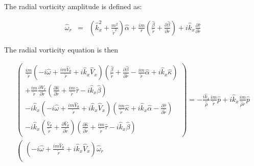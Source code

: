 The radial vorticity amplitude is defined as:

\begin{eqnarray}
\widehat{\omega}_r
&=&
\left(\widehat{k}_x^2 + \frac{m^2}{\widetilde{r}^2} \right) \widehat{\alpha}
+
\frac{im}{r} 
\left(
\frac{\widehat{\beta}}{\widetilde{r}}
+\frac{\partial \widehat{\beta}}{\partial \widetilde{r}}
\right)
+i \widehat{k}_x 
\frac{\partial \widehat{\tau}}{\partial \widetilde{r}}
\nonumber
\end{eqnarray}

The radial vorticity equation is then

\begin{small}
\begin{eqnarray}
\left(
\begin{array}{r}
\frac{i m}{\widetilde{r}}
\left(
-i \widehat{\omega}
+ \frac{i m \widehat{V}_{\theta}}{\widetilde{r}}
+i \widehat{k}_x \widehat{V}_x 
\right) 
\left(
\frac{\widehat{\beta}}{\widetilde{r}}
+\frac{\partial \widehat{\beta}}{\partial \widetilde{r}}
-
\frac{i m}{\widetilde{r}}
\widehat{\alpha}
+ i \widehat{k}_x \widehat{\kappa}
\right) 
\\
+
\frac{i m}{\widetilde{r}}
\frac{\partial \widehat{V}_x}{\partial \widetilde{r}} 
\left(
\frac{\partial \widehat{\kappa}}{\partial \widetilde{r}}
+
\frac{i m}{\widetilde{r}}
\widehat{\tau}
-
i \widehat{k}_x \widehat{\beta}
\right) 
\\
-i \widehat{k}_x
\left(
-i \widehat{\omega} 
+ \frac{i m \widehat{V}_{\theta}}{\widetilde{r}}
+i \widehat{k}_x \widehat{V}_x 
\right) 
\left(
\frac{i m}{\widetilde{r}} \widehat{\kappa}
+
i \widehat{k}_x \widehat{\alpha}
-
\frac{\partial \widehat{\tau}}{\partial \widetilde{r}}
\right) 
\\
-i \widehat{k}_x
\left(
\frac{\widehat{V}_{\theta}}{\widetilde{r}}
+\frac{\partial \widehat{V}_{\theta}}{\partial \widetilde{r}}
\right) 
\left(
\frac{\partial \widehat{\kappa}}{\partial \widetilde{r}}
+
\frac{i m}{\widetilde{r}}
\widehat{\tau}
-
i \widehat{k}_x \widehat{\beta}
\right) 
\end{array}
\right)
 = 
-\frac{i \widehat{k}_x}{\widehat{\overline{\rho}}} 
\frac{i m}{\widetilde{r}}
\widehat{p}
+i \widehat{k}_x \frac{i m}{\widehat{\overline{\rho}} \widetilde{r}} \widehat{p}
\nonumber
\\
\left(
\begin{array}{r}
\left(
-i \widehat{\omega}
+ \frac{i m \widehat{V}_{\theta}}{\widetilde{r}}
+i \widehat{k}_x \widehat{V}_x 
\right) 
\widehat{\omega}_r
\\

\end{array}
\end{eqnarray}
\end{small}
